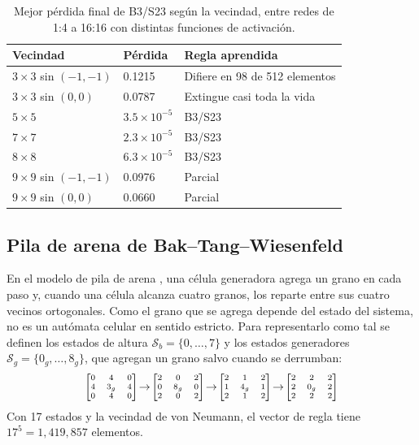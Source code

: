 \begin{table}[!t]
	\centering
	\footnotesize
	\setlength{\tabcolsep}{4pt}
	\begin{tabular}{@{}lll@{}}
		\toprule
		\textbf{Vecindad} & \textbf{Pérdida} & \textbf{Regla aprendida} \\
		\midrule
		$3\times3$ sin $(-1,-1)$ & 0.1215 & Difiere en 98 de 512 elementos \\
		$3\times3$ sin $(0,0)$ & 0.0787 & Extingue casi toda la vida \\
		$5\times5$ & $3.5\times10^{-5}$ & B3/S23 \\
		$7\times7$ & $2.3\times10^{-5}$ & B3/S23 \\
		$8\times8$ & $6.3\times10^{-5}$ & B3/S23 \\
		$9\times9$ sin $(-1,-1)$ & 0.0976 & Parcial \\
		$9\times9$ sin $(0,0)$ & 0.0660 & Parcial \\
		\bottomrule
	\end{tabular}
	\caption{Mejor pérdida final de B3/S23 según la vecindad, entre redes de 1:4 a 16:16 con distintas funciones de activación.}
	\label{tab:gol_vecindad}
\end{table}

\subsection{Pila de arena de Bak--Tang--Wiesenfeld}

En el modelo de pila de arena \cite{bak1987, dhar1999abelian}, una célula generadora agrega un grano en cada paso y, cuando una célula alcanza cuatro granos, los reparte entre sus cuatro vecinos ortogonales. Como el grano que se agrega depende del estado del sistema, no es un autómata celular en sentido estricto. Para representarlo como tal se definen los estados de altura $\mathcal{S}_b = \{0, \dots, 7\}$ y los estados generadores $\mathcal{S}_g = \{0_g, \dots, 8_g\}$, que agregan un grano salvo cuando se derrumban:
\begin{equation*}
	\scriptsize
	\begin{bmatrix} 0 & 4 & 0 \\ 4 & 3_g & 4 \\ 0 & 4 & 0 \end{bmatrix} \!\to\!
	\begin{bmatrix} 2 & 0 & 2 \\ 0 & 8_g & 0 \\ 2 & 0 & 2 \end{bmatrix} \!\to\!
	\begin{bmatrix} 2 & 1 & 2 \\ 1 & 4_g & 1 \\ 2 & 1 & 2 \end{bmatrix} \!\to\!
	\begin{bmatrix} 2 & 2 & 2 \\ 2 & 0_g & 2 \\ 2 & 2 & 2 \end{bmatrix}
\end{equation*}
Con 17 estados y la vecindad de von Neumann, el vector de regla tiene $17^5 = 1{,}419{,}857$ elementos.

